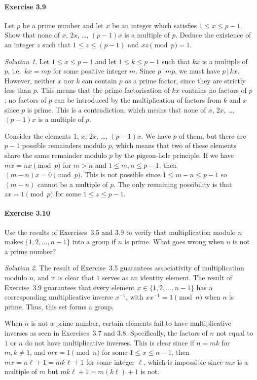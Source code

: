 \documentclass[11pt]{report}
\theoremstyle{remark}
\newtheorem*{solution}{Solution}
\begin{document}
    \paragraph{Exercise 3.9} Let $p$ be a prime number and let $x$ be an integer
    which satisfies $1 \leq x \leq p - 1$. Show that none of $x$, $2x$, \dots, $(p -
    1)x$ is a multiple of $p$. Deduce the existence of an integer $z$ such that $1
    \leq z \leq (p - 1)$ and $xz \pmod{p} = 1$.
    \begin{solution}
        Let $1 \leq x \leq p - 1$ and let $1 \leq k \leq p - 1$ such that $kx$ is a
        multiple of $p$, i.e.\ $kx = mp$ for some positive integer $m$. Since $p
        \,|\, mp$, we must have $p \,|\, kx$. However, neither $x$ nor $k$ can
        contain $p$ as a prime factor, since they are strictly less than $p$. This
        means that the prime factorisation of $kx$ contains no factors of $p$; no
        factors of $p$ can be introduced by the multiplication of factors from $k$
        and $x$ since $p$ is prime. This is a contradiction, which means that none
        of $x$, $2x$, \dots, $(p - 1)x$ is a multiple of $p$.

        Consider the elements $1$, $x$, $2x$, \dots, $(p - 1)x$. We have $p$ of
        them, but there are $p - 1$ possible remainders modulo $p$, which means that
        two of these elements share the same remainder modulo $p$ by the pigeon-hole
        principle. If we have $mx = nx \pmod{p}$ for $m > n$ and $1 \leq m, n \leq p
        - 1$, then $(m - n)x = 0 \pmod{p}$. This is not possible since $1 \leq m - n
        \leq p - 1$ so $(m - n)$ cannot be a multiple of $p$. The only remaining
        possibility is that $zx = 1 \pmod{p}$ for some $1 \leq z \leq p - 1$.
    \end{solution}
    
    \paragraph{Exercise 3.10} Use the results of Exercises~3.5 and 3.9 to verify
    that multiplication modulo $n$ makes $\{1, 2, \dots, n - 1\}$ into a group if
    $n$ is prime. What goes wrong when $n$ is not a prime number?
    \begin{solution}
        The result of Exercise~3.5 guarantees associativity of multiplication modulo
        $n$, and it is clear that $1$ serves as an identity element. The result of
        Exercise~3.9 guarantees that every element $x \in \{1, 2, \dots, n - 1\}$
        has a corresponding multiplicative inverse $x^{-1}$, with $x x^{-1} = 1
        \pmod{n}$ when $n$ is prime. Thus, this set forms a group.

        When $n$ is not a prime number, certain elements fail to have multiplicative
        inverses as seen in Exercises~3.7 and 3.8. Specifically, the factors of $n$
        not equal to $1$ or $n$ do not have multiplicative inverses. This is clear
        since if $n = mk$ for $m, k \neq 1$, and $mx = 1 \pmod{n}$ for some $1 \leq
        x \leq n - 1$, then $mx = n\ell + 1 = mk\ell + 1$ for some integer $\ell$,
        which is impossible since $mx$ is a multiple of $m$ but $mk\ell + 1 =
        m(k\ell) + 1$ is not.
    \end{solution}
    
    
\end{document}
